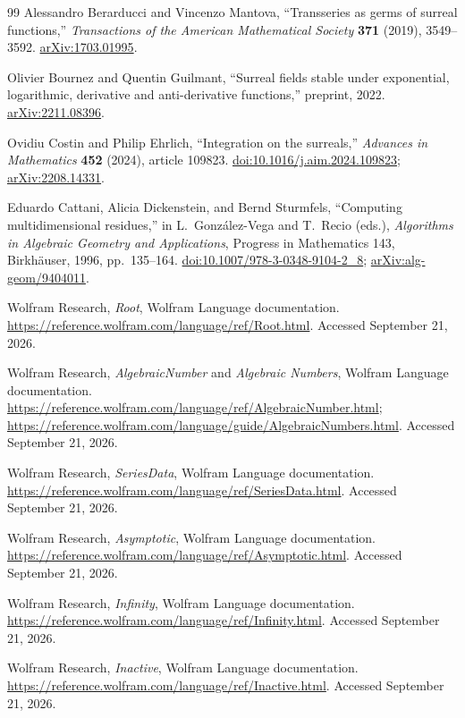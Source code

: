 \documentclass[11pt,letterpaper]{article}
\theoremstyle{definition}\newtheorem{definition}[theorem]{Definition}
\theoremstyle{remark}\newtheorem{remark}[theorem]{Remark}
\numberwithin{equation}{section}\setcounter{tocdepth}{2}
\begin{document}
\begin{thebibliography}{99}
Alessandro Berarducci and Vincenzo Mantova,
``Transseries as germs of surreal functions,''
\emph{Transactions of the American Mathematical Society} \textbf{371} (2019), 3549--3592.
\href{https://arxiv.org/abs/1703.01995}{arXiv:1703.01995}.

Olivier Bournez and Quentin Guilmant,
``Surreal fields stable under exponential, logarithmic, derivative and anti-derivative functions,''
preprint, 2022.
\href{https://arxiv.org/abs/2211.08396}{arXiv:2211.08396}.

Ovidiu Costin and Philip Ehrlich,
``Integration on the surreals,'' \emph{Advances in Mathematics}
\textbf{452} (2024), article 109823.
\href{https://doi.org/10.1016/j.aim.2024.109823}{doi:10.1016/j.aim.2024.109823};
\href{https://arxiv.org/abs/2208.14331}{arXiv:2208.14331}.

Eduardo Cattani, Alicia Dickenstein, and Bernd Sturmfels,
``Computing multidimensional residues,'' in
L.~Gonz\'alez-Vega and T.~Recio (eds.),
\emph{Algorithms in Algebraic Geometry and Applications},
Progress in Mathematics 143, Birkh\"auser, 1996, pp.~135--164.
\href{https://doi.org/10.1007/978-3-0348-9104-2_8}{doi:10.1007/978-3-0348-9104-2\_8};
\href{https://arxiv.org/abs/alg-geom/9404011}{arXiv:alg-geom/9404011}.

Wolfram Research, \emph{Root}, Wolfram Language documentation.
\url{https://reference.wolfram.com/language/ref/Root.html}.
Accessed September 21, 2026.

Wolfram Research, \emph{AlgebraicNumber} and \emph{Algebraic Numbers}, Wolfram Language documentation.
\url{https://reference.wolfram.com/language/ref/AlgebraicNumber.html};
\url{https://reference.wolfram.com/language/guide/AlgebraicNumbers.html}.
Accessed September 21, 2026.

Wolfram Research, \emph{SeriesData}, Wolfram Language documentation.
\url{https://reference.wolfram.com/language/ref/SeriesData.html}.
Accessed September 21, 2026.

Wolfram Research, \emph{Asymptotic}, Wolfram Language documentation.
\url{https://reference.wolfram.com/language/ref/Asymptotic.html}.
Accessed September 21, 2026.

Wolfram Research, \emph{Infinity}, Wolfram Language documentation.
\url{https://reference.wolfram.com/language/ref/Infinity.html}.
Accessed September 21, 2026.

Wolfram Research, \emph{Inactive}, Wolfram Language documentation.
\url{https://reference.wolfram.com/language/ref/Inactive.html}.
Accessed September 21, 2026.


\end{thebibliography}
\end{document}
